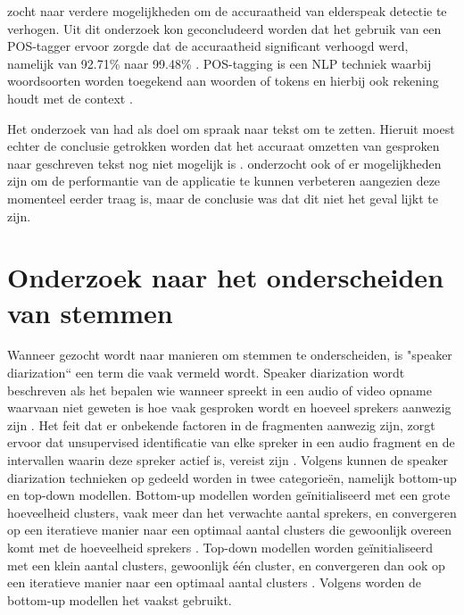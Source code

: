\textcite{Branden2024} zocht naar verdere mogelijkheden om de accuraatheid van elderspeak detectie te verhogen. Uit dit onderzoek kon geconcludeerd worden dat het gebruik van een POS-tagger ervoor zorgde dat de accuraatheid significant verhoogd werd, namelijk van 92.71\% naar 99.48\% \autocite{Branden2024}. POS-tagging is een NLP techniek waarbij woordsoorten worden toegekend aan woorden of tokens en hierbij ook rekening houdt met de context \autocite{Branden2024}.

Het onderzoek van \textcite{Schryver2024} had als doel om spraak naar tekst om te zetten. Hieruit moest echter de conclusie getrokken worden dat het accuraat omzetten van gesproken naar geschreven tekst nog niet mogelijk is \autocite{Schryver2024}. \textcite{Schryver2024} onderzocht ook of er mogelijkheden zijn om de performantie van de applicatie te kunnen verbeteren aangezien deze momenteel eerder traag is, maar de conclusie was dat dit niet het geval lijkt te zijn.

\section{Onderzoek naar het onderscheiden van stemmen}
Wanneer gezocht wordt naar manieren om stemmen te onderscheiden, is "speaker diarization`` een term die vaak vermeld wordt. Speaker diarization wordt beschreven als het bepalen wie wanneer spreekt in een audio of video opname waarvaan niet geweten is hoe vaak gesproken wordt en hoeveel sprekers aanwezig zijn \autocite{AngueraMiro2012}. Het feit dat er onbekende factoren in de fragmenten aanwezig zijn, zorgt ervoor dat unsupervised identificatie van elke spreker in een audio fragment en de intervallen waarin deze spreker actief is, vereist zijn \autocite{AngueraMiro2012}. Volgens \textcite{AngueraMiro2012} kunnen de speaker diarization technieken op gedeeld worden in twee categorieën, namelijk bottom-up en top-down modellen. Bottom-up modellen worden geïnitialiseerd met een grote hoeveelheid clusters, vaak meer dan het verwachte aantal sprekers, en convergeren op een iteratieve manier naar een optimaal aantal clusters die gewoonlijk overeen komt met de hoeveelheid sprekers \autocite{AngueraMiro2012}. Top-down modellen worden geïnitialiseerd met een klein aantal clusters, gewoonlijk één cluster, en convergeren dan ook op een iteratieve manier naar een optimaal aantal clusters \autocite{AngueraMiro2012}. Volgens \textcite{AngueraMiro2012} worden de bottom-up modellen het vaakst gebruikt.

